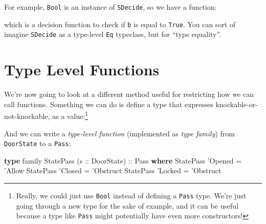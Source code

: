 \documentclass[]{article}
\newenvironment{Shaded}{}{}
\newcommand{\DataTypeTok}[1]{\textcolor[rgb]{0.56,0.13,0.00}{#1}}
\newcommand{\FunctionTok}[1]{\textcolor[rgb]{0.02,0.16,0.49}{#1}}
\newcommand{\KeywordTok}[1]{\textcolor[rgb]{0.00,0.44,0.13}{\textbf{#1}}}
\newcommand{\NormalTok}[1]{#1}
\newcommand{\OtherTok}[1]{\textcolor[rgb]{0.00,0.44,0.13}{#1}}
\begin{document}
For example, \texttt{Bool} is an instance of \texttt{SDecide}, so we have a
function:

\begin{Shaded}
\end{Shaded}

which is a decision function to check if \texttt{b} is equal to
\texttt{\textquotesingle{}True}. You can sort of imagine \texttt{SDecide} as a
type-level \texttt{Eq} typeclass, but for ``type equality''.

\hypertarget{type-level-functions}{%
\section{Type Level Functions}\label{type-level-functions}}

We're now going to look at a different method useful for restricting how we can
call functions. Something we can do is define a type that expresses
knockable-or-not-knockable, as a value:\footnote{Really, we could just use
  \texttt{Bool} instead of defining a \texttt{Pass} type. We're just going
  through a new type for the sake of example, and it can be useful because a
  type like \texttt{Pass} might potentially have even more constructors!}

\begin{Shaded}
\end{Shaded}

And we can write a \emph{type-level function} (implemented as \emph{type
family}) from \texttt{DoorState} to a \texttt{Pass}:

\begin{Shaded}
\begin{Highlighting}[]
\KeywordTok{type}\NormalTok{ family }\DataTypeTok{StatePass}\NormalTok{ (}\OtherTok{s ::} \DataTypeTok{DoorState}\NormalTok{)}\OtherTok{ ::} \DataTypeTok{Pass} \KeywordTok{where}
    \DataTypeTok{StatePass}\NormalTok{ '}\DataTypeTok{Opened} \FunctionTok{=}\NormalTok{ '}\DataTypeTok{Allow}
    \DataTypeTok{StatePass}\NormalTok{ '}\DataTypeTok{Closed} \FunctionTok{=}\NormalTok{ '}\DataTypeTok{Obstruct}
    \DataTypeTok{StatePass}\NormalTok{ '}\DataTypeTok{Locked} \FunctionTok{=}\NormalTok{ '}\DataTypeTok{Obstruct}
\end{Highlighting}
\end{Shaded}
\end{document}
